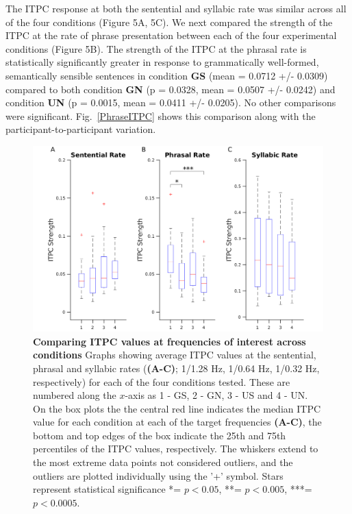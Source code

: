 \documentclass[a4paper,10pt,twoside]{article}
\begin{document}
The ITPC response at both the sentential and syllabic rate was similar across all of the four conditions (Figure 5A, 5C). We next compared the strength of the ITPC at the rate of phrase presentation between each of the four experimental conditions (Figure 5B). The strength of the ITPC at the phrasal rate is statistically significantly greater in response to grammatically well-formed, semantically sensible sentences in  condition \textbf{GS} (mean = 0.0712 +/- 0.0309) compared to both condition \textbf{GN} (p = 0.0328, mean = 0.0507 +/- 0.0242) and condition \textbf{UN} (p = 0.0015, mean = 0.0411 +/- 0.0205). No other comparisons were significant. Fig.~\ref{PhraseITPC} shows this comparison along with the participant-to-participant variation.




\begin{figure}[tbp]
\includegraphics[width=\linewidth]{ITPC_peaks.png}
\caption{\textbf{Comparing ITPC values at frequencies of interest
    across conditions} Graphs showing average ITPC values at the
  sentential, phrasal and syllabic rates (\textbf{(A-C)}; 1/1.28 Hz,
  1/0.64 Hz, 1/0.32 Hz, respectively) for each of the four conditions
  tested. These are numbered along the $x$-axis as 1 - GS, 2 - GN, 3 - US and 4 - UN.
  On the box plots the the central red line indicates the
  median ITPC value for each condition at each of the target
  frequencies \textbf{(A-C)}, the bottom and top edges of the box
  indicate the 25th and 75th percentiles of the ITPC values,
  respectively. The whiskers extend to the most extreme data points
  not considered outliers, and the outliers are plotted individually
  using the '+' symbol. Stars represent statistical significance *=
  $p<0.05$, **= $p<0.005$, ***= $p<0.0005$.}
\label{ITPC_peaks}
\end{figure}
\end{document}

